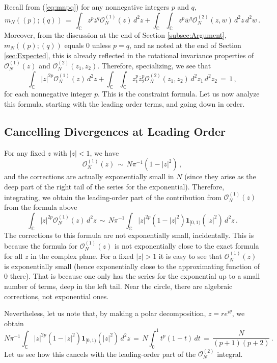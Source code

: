 \documentclass[12pt]{report}
\newcommand{\C}{\mathbb{C}}
\newcommand{\be}{\begin{equation}}
\newcommand{\ee}{\end{equation}}
\theoremstyle{definition}
\begin{document}
Recall from (\ref{eq:mnpq})
for any nonnegative integers $p$ and $q$,
$$
m_N((p);(q))\, =\, \int_{\C} z^p \overline{z}^q \mathcal{O}_N^{(1)}(z)\, d^2z 
+ \int_{\C} \int_{\C} z^p \overline{w}^q \mathcal{O}_N^{(2)}(z,w)\, d^2z\, d^2w\, .
$$
Moreover, from the discussion at the end of Section \ref{subsec:Argument},
$m_N((p);(q))$ equals $0$ unless $p=q$, and as noted at the end of Section \ref{sec:Expected}, this is already reflected in the rotational invariance properties of
$\mathcal{O}_N^{(1)}(z)$ and $\mathcal{O}_N^{(2)}(z_1,z_2)$.
Therefore, specializing, we see that
\be
\label{eq:MoTot}
\int_{\C} |z|^{2p} \mathcal{O}_N^{(1)}(z)\, d^2z 
+ \int_{\C} \int_{\C} z_1^p \overline{z}_2^p \mathcal{O}_N^{(2)}(z_1,z_2)\, d^2z_1\, d^2z_2\, =\, 1\, ,
\ee
for each nonnegative integer $p$.
This is the constraint formula.
Let us now analyze this formula, starting with the leading order terms, and going down in order.

\subsection{Cancelling Divergences at Leading Order}

For any fixed $z$ with $|z|<1$, we have
\be
\mathcal{O}_N^{(1)}(z)\, \sim\, N \pi^{-1} (1-|z|^2)\, ,
\ee
and the corrections are actually exponentially small in $N$ (since they arise as the deep part of the right tail of the series for the exponential).
Therefore, integrating, we obtain the leading-order part of the contribution from $\mathcal{O}_N^{(1)}(z)$ from the formula above
\be
\int_{\C} |z|^{2p} \mathcal{O}_N^{(1)}(z)\, d^2z\, \sim\, N \pi^{-1} \int_{\C} |z|^{2p}(1-|z|^2) \mathbf{1}_{[0,1)}(|z|^2)\, d^2z\, .
\ee
The corrections to this formula are not exponentially small, incidentally.
This is because the formula for $\mathcal{O}_N^{(1)}(z)$ is not exponentially close to the exact formula for all $z$ in the complex plane.
For a fixed $|z|>1$ it is easy to see that $\mathcal{O}_N^{(1)}(z)$ is exponentially small (hence exponentially close to the approximating function of $0$ there).
That is because one only has the series for the exponential up to a small number of terms, deep in the left tail.
Near the circle, there are algebraic corrections, not exponential ones.

Nevertheless, let us note that, by making a polar decomposition, $z=r e^{i\theta}$, we obtain
\be
N \pi^{-1} \int_{\C} |z|^{2p}(1-|z|^2) \mathbf{1}_{[0,1)}(|z|^2)\, d^2z\, 
=\, N \int_0^1 t^p (1-t)\, dt\, =\, \frac{N}{(p+1)(p+2)}\, .
\ee
Let us see how this cancels with the leading-order part of the $\mathcal{O}_N^{(2)}$ integral.
\end{document}
